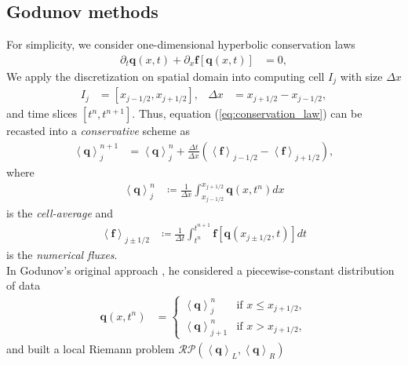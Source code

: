 \subsection{Godunov methods}
\label{section3.1.2}
For simplicity, we consider one-dimensional hyperbolic conservation laws
\begin{align}\label{eq:conservation_law}
    \partial_t \mathbf{q}\left(x,t\right) + \partial_x \mathbf{f} \left[\mathbf{q}\left(x,t\right)\right] &= 0,
\end{align}
We apply the discretization on spatial domain into computing cell $I_j$ with size $\Delta x$
\begin{align}
    I_j &= \left[ x_{j-1/2},x_{j+1/2} \right], & \Delta x &= x_{j+1/2}-x_{j-1/2},
\end{align}
and time slices $\left[t^n, t^{n+1}\right]$.
Thus, equation (\ref{eq:conservation_law}) can be recasted into a \textit{conservative} scheme as
\begin{align}
    \left\langle\mathbf{q}\right\rangle^{n+1}_j &= \left\langle\mathbf{q}\right\rangle^n_j 
    + \frac{\Delta t}{\Delta x} \left( \left\langle\mathbf{f}\right\rangle_{j-1/2} - \left\langle\mathbf{f}\right\rangle_{j+1/2} \right),
\end{align}
where
\begin{align}
    \left\langle\mathbf{q}\right\rangle^{n}_j &\coloneqq \frac{1}{\Delta x} \int^{x_{j+1/2}}_{x_{j-1/2}} \mathbf{q} \left(x, t^n\right) dx
\end{align}
is the \textit{cell-average} and
\begin{align}
    \left\langle\mathbf{f}\right\rangle_{j\pm 1/2} &\coloneqq \frac{1}{\Delta t} \int^{t^{n+1}}_{t^n} \mathbf{f} \left[\mathbf{q}\left(x_{j\pm 1/2},t\right)\right] dt
\end{align}
is the \textit{numerical fluxes}.\\
In Godunov's original approach \cite{konstantinovich1959difference},
he considered a piecewise-constant distribution of data
\begin{align}
    \mathbf{q}(x, t^n) &=
    \begin{cases}
        \left\langle\mathbf{q}\right\rangle^{n}_j  &\text{if } x \leq x_{j+1/2}, \\
        \left\langle\mathbf{q}\right\rangle^{n}_{j+1}  &\text{if } x >x_{j+1/2},
    \end{cases}
\end{align}
and built a local Riemann problem 
$\mathcal{RP}\left(\left\langle \mathbf{q}\right\rangle_{L}, \left\langle \mathbf{q} \right\rangle_{R} \right)$
